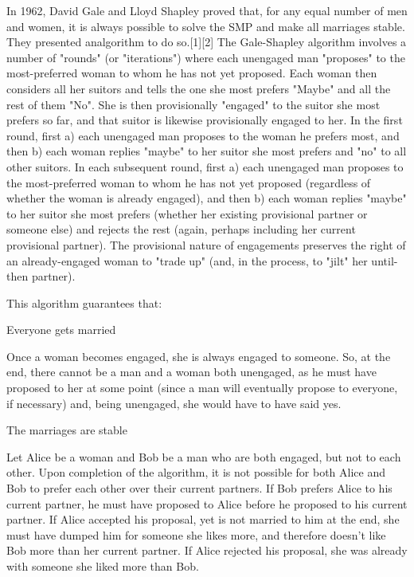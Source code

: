\documentclass[10pt,letterpaper,twocolumn,twosided]{article}
\newcommand{\codigofuente}[1]{

\dotfill
}
\begin{document}
In 1962, David Gale and Lloyd Shapley proved that, for any equal number of men and women, it is always possible to solve the SMP and make all marriages stable. They presented analgorithm to do so.[1][2]
The Gale-Shapley algorithm involves a number of "rounds" (or "iterations") where each unengaged man "proposes" to the most-preferred woman to whom he has not yet proposed. Each woman then considers all her suitors and tells the one she most prefers "Maybe" and all the rest of them "No". She is then provisionally "engaged" to the suitor she most prefers so far, and that suitor is likewise provisionally engaged to her. In the first round, first a) each unengaged man proposes to the woman he prefers most, and then b) each woman replies "maybe" to her suitor she most prefers and "no" to all other suitors. In each subsequent round, first a) each unengaged man proposes to the most-preferred woman to whom he has not yet proposed (regardless of whether the woman is already engaged), and then b) each woman replies "maybe" to her suitor she most prefers (whether her existing provisional partner or someone else) and rejects the rest (again, perhaps including her current provisional partner). The provisional nature of engagements preserves the right of an already-engaged woman to "trade up" (and, in the process, to "jilt" her until-then partner).

This algorithm guarantees that:

Everyone gets married 

Once a woman becomes engaged, she is always engaged to someone. So, at the end, there cannot be a man and a woman both unengaged, as he must have proposed to her at some point (since a man will eventually propose to everyone, if necessary) and, being unengaged, she would have to have said yes.

The marriages are stable 

Let Alice be a woman and Bob be a man who are both engaged, but not to each other. Upon completion of the algorithm, it is not possible for both Alice and Bob to prefer each other over their current partners. If Bob prefers Alice to his current partner, he must have proposed to Alice before he proposed to his current partner. If Alice accepted his proposal, yet is not married to him at the end, she must have dumped him for someone she likes more, and therefore doesn't like Bob more than her current partner. If Alice rejected his proposal, she was already with someone she liked more than Bob.

\codigofuente{src/misc/stable.cpp}
\end{document}
